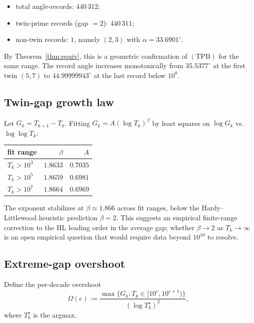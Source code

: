 \documentclass[11pt]{article}
\begin{document}
\begin{itemize}
\item total angle-records: $440\,312$;
\item twin-prime records (gap $=2$): $440\,311$;
\item non-twin records: $1$, namely $(2,3)$ with $\alpha=33.6901^\circ$.
\end{itemize}

By Theorem~\ref{thm:equiv}, this is a geometric confirmation of
$(\mathrm{TPB})$ for the same range. The record angle increases
monotonically from $35.5377^\circ$ at the first twin $(5,7)$ to
$44.99999943^\circ$ at the last record below $10^8$.

\subsection{Twin-gap growth law}

Let $G_k=T_{k+1}-T_k$. Fitting
$G_k=A(\log T_k)^\beta$ by least squares on $\log G_k$ vs.\
$\log\log T_k$:

\begin{center}
\begin{tabular}{lrr}
\toprule
fit range & $\beta$ & $A$ \\
\midrule
$T_k>10^3$ & $1.8633$ & $0.7035$ \\
$T_k>10^5$ & $1.8659$ & $0.6981$ \\
$T_k>10^7$ & $1.8664$ & $0.6969$ \\
\bottomrule
\end{tabular}
\end{center}

The exponent stabilizes at $\beta\approx 1.866$ across fit ranges,
below the Hardy--Littlewood heuristic prediction $\beta=2$. This
suggests an empirical finite-range correction to the HL leading order
in the average gap; whether $\beta\to 2$ as $T_k\to\infty$ is an open
empirical question that would require data beyond $10^{10}$ to
resolve.

\subsection{Extreme-gap overshoot}

Define the per-decade overshoot
\[
\Omega(e):=\frac{\max\{G_k\colon T_k\in[10^e,10^{e+1})\}}{(\log T_k^\star)^2},
\]
where $T_k^\star$ is the argmax.
\end{document}
